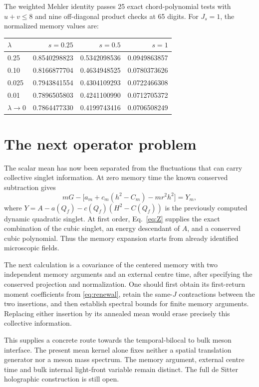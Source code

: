 \documentclass[11pt,a4paper]{article}
\begin{document}
The weighted Mehler identity passes 25 exact chord-polynomial tests
with $u+v\leq8$ and nine off-diagonal product checks at 65 digits.
For $J_s=1$, the normalized memory values are:
\begin{center}\begin{tabular}{lrrr}\toprule
$\lambda$ & $s=0.25$ & $s=0.5$ & $s=1$ \\\midrule
0.25 & 0.8540298823 & 0.5342098536 & 0.0949863857 \\
0.10 & 0.8166877704 & 0.4634948525 & 0.0780373626 \\
0.025 & 0.7943841554 & 0.4304109293 & 0.0722466308 \\
0.01 & 0.7896505803 & 0.4241100990 & 0.0712705372 \\
$\lambda\to0$ & 0.7864477330 & 0.4199743416 & 0.0706508249 \\\bottomrule
\end{tabular}\end{center}

\newpage
\section{The next operator problem}
The scalar mean has now been separated from the fluctuations that
can carry collective singlet information. At zero memory time the
known conserved subtraction gives
\begin{equation}
 mG-\bigl[a_m+c_m(h^2-C_m)-mr^2h^2\bigr]=Y_m,
\end{equation}
where $Y=A-a(Q_f)-c(Q_f)(H^2-C(Q_f))$ is the previously computed
dynamic quadratic singlet. At first order, Eq.~\eqref{eq:Z}
supplies the exact combination of the cubic singlet, an energy
descendant of $A$, and a conserved cubic polynomial. Thus the
memory expansion starts from already identified microscopic fields.

The next calculation is a covariance of the centered memory with
two independent memory arguments and an external centre time,
after specifying the conserved projection and normalization.
One should first obtain its first-return moment coefficients from
\eqref{eq:renewal}, retain the same-$J$ contractions between the two
insertions, and then establish spectral bounds for finite memory
arguments. Replacing either insertion by its annealed mean would
erase precisely this collective information.

This supplies a concrete route towards the temporal-bilocal to bulk
meson interface. The present mean kernel alone fixes neither a spatial
translation generator nor a meson mass spectrum. The memory argument,
external centre time and bulk internal light-front variable remain
distinct. The full de Sitter holographic construction is still open.
\end{document}
